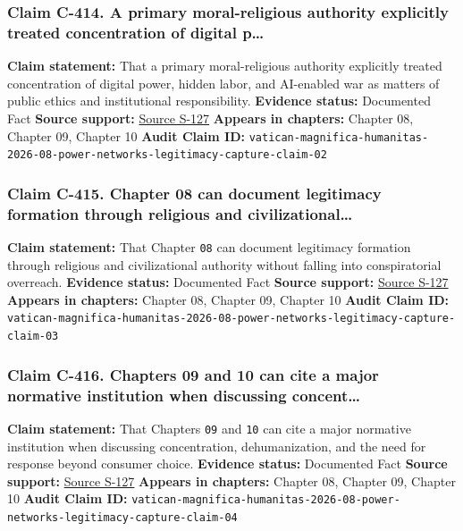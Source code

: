 \documentclass[
  american,
  11pt,
  letterpaper,
]{article}
\begin{document}
\subsubsection{Claim C-414. A primary moral-religious authority
explicitly treated concentration of digital
p\ldots{}}\label{claim-c-414-a-primary-moral-religious-authority-explicitly-treated-concentration-of-digital-p}

\textbf{Claim statement:} That a primary moral-religious authority
explicitly treated concentration of digital power, hidden labor, and
AI-enabled war as matters of public ethics and institutional
responsibility. \textbf{Evidence status:} Documented Fact \textbf{Source
support:}
\hyperref[source-s-127-encyclical-letter-of-his-holiness-leo-xiv-magnifica-humanitas]{Source
S-127} \textbf{Appears in chapters:} Chapter 08, Chapter 09, Chapter 10
\textbf{Audit Claim ID:}
\texttt{vatican-magnifica-humanitas-2026-08-power-networks-legitimacy-capture-claim-02}

\subsubsection{Claim C-415. Chapter 08 can document legitimacy formation
through religious and
civilizational\ldots{}}\label{claim-c-415-chapter-08-can-document-legitimacy-formation-through-religious-and-civilizational}

\textbf{Claim statement:} That Chapter \texttt{08} can document
legitimacy formation through religious and civilizational authority
without falling into conspiratorial overreach. \textbf{Evidence status:}
Documented Fact \textbf{Source support:}
\hyperref[source-s-127-encyclical-letter-of-his-holiness-leo-xiv-magnifica-humanitas]{Source
S-127} \textbf{Appears in chapters:} Chapter 08, Chapter 09, Chapter 10
\textbf{Audit Claim ID:}
\texttt{vatican-magnifica-humanitas-2026-08-power-networks-legitimacy-capture-claim-03}

\subsubsection{Claim C-416. Chapters 09 and 10 can cite a major
normative institution when discussing
concent\ldots{}}\label{claim-c-416-chapters-09-and-10-can-cite-a-major-normative-institution-when-discussing-concent}

\textbf{Claim statement:} That Chapters \texttt{09} and \texttt{10} can
cite a major normative institution when discussing concentration,
dehumanization, and the need for response beyond consumer choice.
\textbf{Evidence status:} Documented Fact \textbf{Source support:}
\hyperref[source-s-127-encyclical-letter-of-his-holiness-leo-xiv-magnifica-humanitas]{Source
S-127} \textbf{Appears in chapters:} Chapter 08, Chapter 09, Chapter 10
\textbf{Audit Claim ID:}
\texttt{vatican-magnifica-humanitas-2026-08-power-networks-legitimacy-capture-claim-04}
\end{document}
